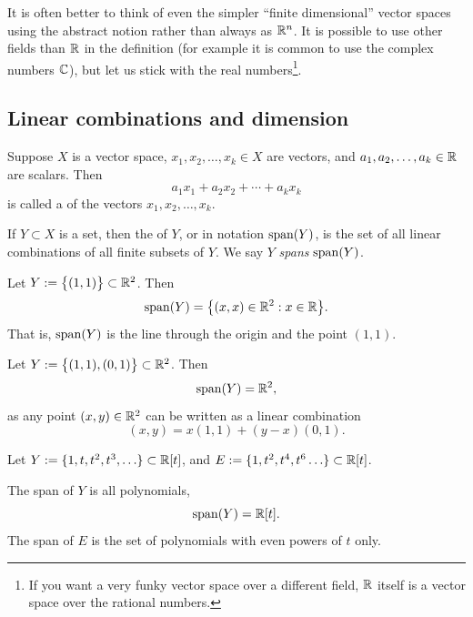 It is often better to think of even the simpler ``finite dimensional''
vector spaces using the abstract notion rather than always as ${\mathbb{R}}^n$.
It is possible to use other fields than ${\mathbb{R}}$ in the definition (for
example it is common to use the complex numbers ${\mathbb{C}}$), but let us stick with
the real numbers\footnote{If you want a very funky vector space over a different field,
${\mathbb{R}}$ itself is a vector space over the rational numbers.}.

\subsection{Linear combinations and dimension}

\begin{defn}
Suppose $X$ is a vector space,
$x_1, x_2, \ldots, x_k \in X$ are vectors, and
$a_1, a_2, \ldots, a_k \in {\mathbb{R}}$ are scalars.  Then
\begin{equation*}
a_1 x_1 + 
a_2 x_2 +  \cdots
+ a_k x_k
\end{equation*}
is called a \emph{} of the vectors $x_1, x_2,
\ldots, x_k$.

If $Y \subset X$ is a set, then the \emph{} of $Y$, or in notation
$\operatorname{span}(Y)$, is the set of all linear combinations
of all finite subsets of $Y$.  We 
say $Y$ \emph{spans} $\operatorname{span}(Y)$.
\end{defn}

\begin{example}
Let $Y := \bigl\{ (1,1) \bigr\} \subset {\mathbb{R}}^2$.  Then
\begin{equation*}
\operatorname{span}(Y)
=
\bigl\{ (x,x) \in {\mathbb{R}}^2 : x \in {\mathbb{R}} \bigr\} .
\end{equation*}
That is, $\operatorname{span}(Y)$ is the line through the origin and the point $(1,1)$.
\end{example}

\begin{example} \label{example:vecspr2span}
Let $Y := \bigl\{ (1,1), (0,1) \bigr\} \subset {\mathbb{R}}^2$.  Then
\begin{equation*}
\operatorname{span}(Y)
=
{\mathbb{R}}^2 ,
\end{equation*}
as any point $(x,y) \in {\mathbb{R}}^2$ can be written as
a linear combination
\begin{equation*}
(x,y) = x (1,1) + (y-x) (0,1) .
\end{equation*}
\end{example}

\begin{example}
Let $Y := \{ 1, t, t^2, t^3, \ldots \} \subset {\mathbb{R}}[t]$, and
$E := \{ 1, t^2, t^4, t^6 \ldots \} \subset {\mathbb{R}}[t]$.

The span of $Y$ is all polynomials,
\begin{equation*}
\operatorname{span}(Y) = {\mathbb{R}}[t] .
\end{equation*}
The span of $E$ is the set of polynomials with even powers of $t$ only.
\end{example}

